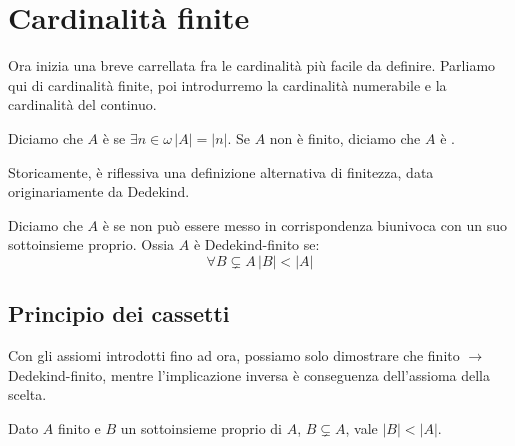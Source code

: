 \section{Cardinalità finite}
Ora inizia una breve carrellata fra le cardinalità più facile da definire. Parliamo qui di cardinalità finite, poi introdurremo la cardinalità numerabile e la cardinalità del continuo.

\begin{definition}
	Diciamo che $A$ è  se $\exists n \in \omega \, |A| = |n|$. Se $A$ non è finito, diciamo che $A$ è .
\end{definition}

Storicamente, è riflessiva una definizione alternativa di finitezza, data originariamente da Dedekind.

\begin{definition}
	Diciamo che $A$ è  se non può essere messo in corrispondenza biunivoca con un suo sottoinsieme proprio. Ossia $A$ è Dedekind-finito se:
	\[ \forall B \subsetneq A \, |B| < |A|
		\]
\end{definition}

\subsection{Principio dei cassetti}
Con gli assiomi introdotti fino ad ora, possiamo solo dimostrare che finito $\rightarrow$ Dedekind-finito, mentre l'implicazione inversa è conseguenza dell'assioma della scelta.

\begin{proposition}
	\label{cassetti}
	Dato $A$ finito e $B$ un sottoinsieme proprio di $A$, $B \subsetneq A$, vale $|B| < |A|$. 
\end{proposition}

